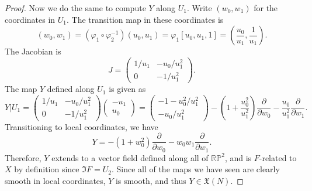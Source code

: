 \documentclass[11pt, letterpaper]{article}
\begin{document}
\begin{proof}
	Now we do the same to compute $Y$ along $U_1$. Write $(w_0,w_1)$ for the coordinates in $U_1$. The transition map in these coordinates is
	\[
		(w_0,w_1)=\left( \varphi _1\circ \varphi _2^{-1}  \right) (u_0,u_1)=\varphi _1[u_0,u_1,1]=\left( \frac{u_0}{u_1} ,\frac{1}{u_1}  \right) 
	.\]
	The Jacobian is
	\[
		J=\begin{pmatrix}
		1/u_1 & -u_0/u_1^2 \\
		0 & -1/u_1^2
		\end{pmatrix}
	.\]
	The map $Y$ defined along $U_1$ is given as
	\[
		Y|U_1=\begin{pmatrix}
		1/u_1 & -u_0/u_1^2 \\
		0 & -1/u_1^2
		\end{pmatrix}\begin{pmatrix}
		-u_1 \\
		u_0
		\end{pmatrix}=\begin{pmatrix}
		-1-u_0^2/u_1^2 \\
		-u_0/u_1^2
		\end{pmatrix}-\left( 1+\frac{u_0^2}{u_1^2}  \right) \frac{\partial }{\partial w_0} -\frac{u_0}{u_1^2} \frac{\partial }{\partial w_1} 
	.\]
	Transitioning to local coordinates, we have
	\[
		Y=-\left( 1+w_0^2 \right) \frac{\partial }{\partial w_0} -w_0w_1 \frac{\partial }{\partial w_1} 
	.\]
	Therefore, $Y$ extends to a vector field defined along all of $\mathbb{R} \mathbb{P} ^2$, and is $F$-related to $X$ by definition since $\Im F=U_2$.  Since all of the maps we have seen are clearly smooth in local coordinates, $Y$ is smooth, and thus $Y\in \mathfrak{X} (N)$.
\end{proof}
\end{document}
